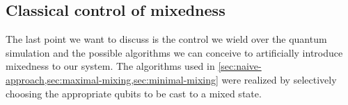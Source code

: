 \subsection{Classical control of mixedness}
The last point we want to discuss is the control we wield over the quantum
simulation and the possible algorithms we can conceive to artificially
introduce mixedness to our system. The algorithms used in
\cref{sec:naive-approach,sec:maximal-mixing,sec:minimal-mixing} were realized
by selectively choosing the appropriate qubits to be cast to a mixed state.

%  
